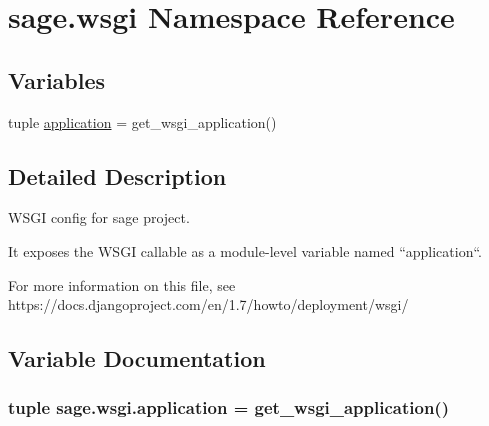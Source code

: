 \hypertarget{namespacesage_1_1wsgi}{}\section{sage.\+wsgi Namespace Reference}
\label{namespacesage_1_1wsgi}
\subsection*{Variables}
\begin{DoxyCompactItemize}
\item 
tuple \hyperlink{namespacesage_1_1wsgi_a1ddb23bace7377dbda42c61a804bb9aa}{application} = get\+\_\+wsgi\+\_\+application()
\end{DoxyCompactItemize}


\subsection{Detailed Description}
\begin{DoxyVerb}WSGI config for sage project.

It exposes the WSGI callable as a module-level variable named ``application``.

For more information on this file, see
https://docs.djangoproject.com/en/1.7/howto/deployment/wsgi/
\end{DoxyVerb}
 

\subsection{Variable Documentation}
\hypertarget{namespacesage_1_1wsgi_a1ddb23bace7377dbda42c61a804bb9aa}{}
\subsubsection[{application}]{\setlength{\rightskip}{0pt plus 5cm}tuple sage.\+wsgi.\+application = get\+\_\+wsgi\+\_\+application()}\label{namespacesage_1_1wsgi_a1ddb23bace7377dbda42c61a804bb9aa}
